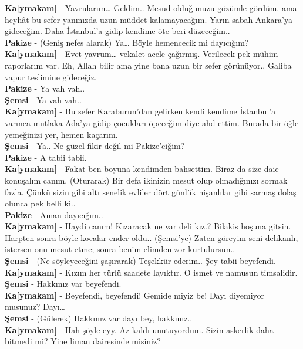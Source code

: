 \documentclass[]{book}
\begin{document}
\textbf{Ka{[}ymakam{]}} - Yavrularım\ldots{} Geldim.. Mesud olduğunuzu gözümle gördüm. ama heyhât bu sefer yanınızda uzun müddet kalamayacağım. Yarın sabah Ankara'ya gideceğim. Daha İstanbul'a gidip kendime öte beri düzeceğim..\\
\textbf{Pakize} - (Geniş nefes alarak) Ya\ldots{} Böyle hemencecik mi dayıcığım?\\
\textbf{Ka{[}ymakam{]}} - Evet yavrum\ldots{} vekalet acele çağırmış. Verilecek pek mühim raporlarım var. Eh, Allah bilir ama yine bana uzun bir sefer görünüyor.. Galiba vapur teslimine gideceğiz.\\
\textbf{Pakize} - Ya vah vah..\\
\textbf{Şemsi} - Ya vah vah..\\
\textbf{Ka{[}ymakam{]}} - Bu sefer Karaburun'dan gelirken kendi kendime İstanbul'a varınca mutlaka Ada'ya gidip çocukları öpeceğim diye ahd ettim. Burada bir öğle yemeğinizi yer, hemen kaçarım.\\
\textbf{Şemsi} - Ya.. Ne güzel fikir değil mi Pakize'ciğim?\\
\textbf{Pakize} - A tabii tabii.\\
\textbf{Ka{[}ymakam{]}} - Fakat ben boyuna kendimden bahsettim. Biraz da size daie konuşalım canım. (Oturarak) Bir defa ikinizin mesut olup olmadığınızı sormak fazla. Çünkü sizin gibi altı senelik evliler dört günlük nişanlılar gibi sarmaş dolaş olunca pek belli ki..\\
\textbf{Pakize} - Aman dayıcığım..\\
\textbf{Ka{[}ymakam{]}} - Haydi canım! Kızaracak ne var deli kız.? Bilakis hoşuna gitsin. Harpten sonra böyle kocalar ender oldu.. (Şemsi'ye) Zaten göreyim seni delikanlı, istersen onu mesut etme; sonra benim elimden zor kurtulursun..\\
\textbf{Şemsi} - (Ne söyleyeceğini şaşırarak) Teşekkür ederim.. Şey tabii beyefendi.\\
\textbf{Ka{[}ymakam{]}} - Kızım her türlü saadete layıktır. O ismet ve namusun timsalidir.\\
\textbf{Şemsi} - Hakkınız var beyefendi.\\
\textbf{Ka{[}ymakam{]}} - Beyefendi, beyefendi! Gemide miyiz be! Dayı diyemiyor musunuz? Dayı\ldots{}\\
\textbf{Şemsi} - (Gülerek) Hakkınız var dayı bey, hakkınız..\\
\textbf{Ka{[}ymakam{]}} - Hah şöyle eyy. Az kaldı unutuyordum. Sizin askerlik daha bitmedi mi? Yine liman dairesinde misiniz?\\
\end{document}

